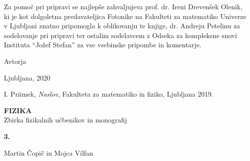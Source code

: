\documentclass[a4paper,10pt,fleqn]{book}
\begin{document}
Za pomoč pri pripravi se najlepše zahvaljujeva prof. dr. Ireni Drevenšek Olenik, ki je 
kot dolgoletna predavateljica Fotonike na Fakulteti za matematiko Univerze v Ljubljani
znatno pripomogla k oblikovanju te knjige, dr. Andreju Petelinu za sodelovanje pri pripravi ter 
ostalim sodelavcem z Odseka za kompleksne snovi Instituta ``Jožef Stefan'' za vse vsebinske pripombe
in komentarje.

\vspace{1em}

Avtorja

\hfill Ljubljana, 2020


\lihastran
\tableofcontents


\lihastran













\lihastran
{}
\begin{thebibliography}{9}

   I. Priimek,
   \emph{Naslov},
   Fakulteta za matematiko in fiziko, Ljubljana 2019.

\end{thebibliography}


\lihastran
{}
\sloppy
\raggedright
\footnotesize
\printindex
\normalsize


\sodastran
\thispagestyle{empty}
\parindent=0pt

\textbf{FIZIKA} \\
Zbirka fizikalnih učbenikov in monografij

\bigskip
\bigskip
\textbf{\large 3.}

\bigskip
Martin Čopič in Mojca Vilfan
\end{document}
